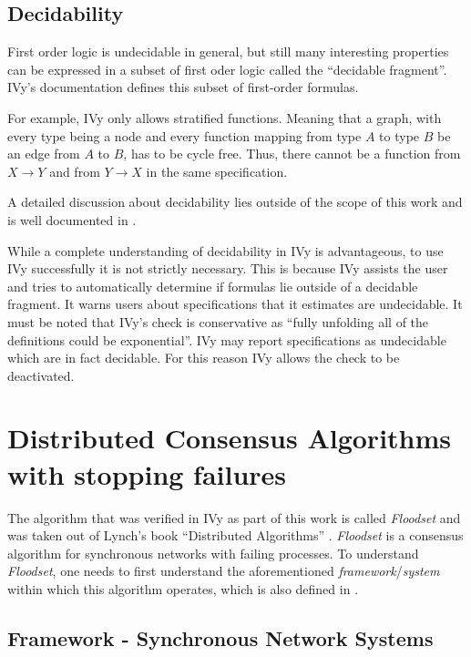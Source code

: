\documentclass[fleqn]{article}
\begin{document}
\subsection{Decidability}
First order logic is undecidable in general, but still many interesting properties can be expressed in a subset of first oder logic called the ``decidable fragment''. IVy's documentation defines this subset of first-order formulas. \cite{decid}

For example, IVy only allows stratified functions. Meaning that a graph, with every type being a node and every function mapping from type $A$ to type $B$ be an edge from $A$ to $B$, has to be cycle free. Thus, there cannot be a function from $X \rightarrow Y$ and from $Y \rightarrow X$ in the same specification.

A detailed discussion about decidability lies outside of the scope of this work and is well documented in \cite{decid}.

While a complete understanding of decidability in IVy is advantageous, to use IVy successfully it is not strictly necessary. This is because IVy assists the user and tries to automatically determine if formulas lie outside of a decidable fragment. It warns users about specifications that it estimates are undecidable.  It must be noted that IVy's check is conservative as ``fully unfolding all of the definitions could be exponential''. IVy may report specifications as undecidable which are in fact decidable. For this reason IVy allows the check to be deactivated. \cite{decid}


\section{Distributed Consensus Algorithms with stopping failures}

The algorithm that was verified in IVy as part of this work is called \textit{Floodset} and was taken out of Lynch's book ``Distributed Algorithms'' \cite{refNancy}.
\textit{Floodset} is a consensus algorithm for synchronous networks with failing processes.
To understand \textit{Floodset}, one needs to first understand the aforementioned \textit{framework}/\textit{system} within which this algorithm operates, which is also defined in \cite{refNancy}.

\subsection{Framework - Synchronous Network Systems}
\end{document}
